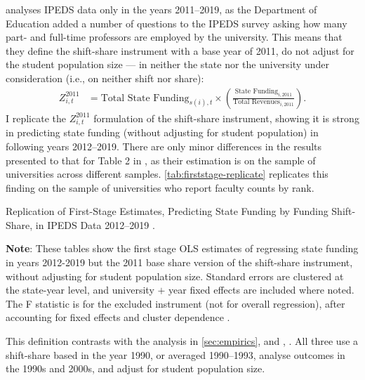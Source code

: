 \cite{hinrichs2022state} analyses IPEDS data only in the years 2011--2019, as the Department of Education added a number of questions to the IPEDS survey asking how many part- and full-time professors are employed by the university.
This means that they define the shift-share instrument with a base year of 2011, do not adjust for the student population size --- in neither the state nor the university under consideration (i.e., on neither shift nor share):
\begin{align}
    \label{eqn:replication-instrument}
    Z^{2011}_{i,t} &=
    \text{Total State Funding}_{s(i),t} \times
    \left( \frac{\text{State Funding}_{i,2011}}{\text{Total Revenues}_{i,2011}} \right).
\end{align}
I replicate the $Z^{2011}_{i,t}$ formulation of the shift-share instrument, showing it is strong in predicting state funding (without adjusting for student population) in following years 2012--2019.
There are only minor differences in the results presented to that for Table 2 in \cite{hinrichs2022state}, as their estimation is on the sample of universities across different samples.
\autoref{tab:firststage-replicate} replicates this finding on the sample of universities who report faculty counts by rank.
\begin{table}[H]
    \singlespacing
    \centering
    \caption{Replication of First-Stage Estimates, Predicting State Funding by Funding Shift-Share, in IPEDS Data 2012--2019 \citep{hinrichs2022state}.}
    \makebox[\textwidth][c]{}
    \label{tab:firststage-replicate}
    \justify
    \footnotesize
    \textbf{Note}:
    These tables show the first stage OLS estimates of regressing state funding in years 2012-2019 but the 2011 base share version of the shift-share instrument, without adjusting for student population size.
    Standard errors are clustered at the state-year level, and university $+$ year fixed effects are included where noted.
    The F statistic is for the excluded instrument (not for overall regression), after accounting for fixed effects and cluster dependence \citep{olea2013robust}.
\end{table}
This definition contrasts with the analysis in \autoref{sec:empirics}, and \cite{NBERw23736}, \cite{NBERw23736}.
All three use a shift-share based in the year 1990, or averaged 1990--1993, analyse outcomes in the 1990s and 2000s, and adjust for student population size.

